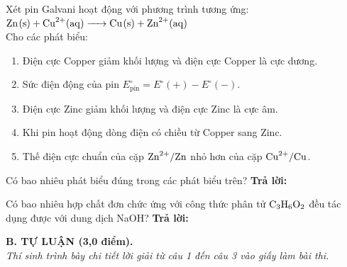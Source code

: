 \documentclass[11pt,a4paper]{article}
\begin{document}
\begin{ex}
Xét pin Galvani hoạt động với phương trình tương ứng: $\ce{Zn(s) + Cu^2+(aq) -> Cu(s) + Zn^2+(aq)}$\\
Cho các phát biểu:
\begin{enumerate}[label=(\alph*),leftmargin=20pt,itemsep=1pt]
\item Điện cực Copper giảm khối lượng và điện cực Copper là cực dương.
\item Sức điện động của pin $E^\circ_\text{pin} = E^\circ(+) - E^\circ(-)$.
\item Điện cực Zinc giảm khối lượng và điện cực Zinc là cực âm.
\item Khi pin hoạt động dòng điện có chiều từ Copper sang Zinc.
\item Thế điện cực chuẩn của cặp $\ce{Zn^2+}/\ce{Zn}$ nhỏ hơn của cặp $\ce{Cu^2+}/\ce{Cu}$.
\end{enumerate}
Có bao nhiêu phát biểu đúng trong các phát biểu trên?
\hfill \textbf{Trả lời:} \dotfill

\end{ex}
\begin{ex}
Có bao nhiêu hợp chất đơn chức ứng với công thức phân tử $\ce{C3H6O2}$ đều tác dụng được với dung dịch NaOH?
\hfill \textbf{Trả lời:} \dotfill

\end{ex}
\vspace{4pt}
\noindent
{\color{mainGreen}\textbf{\Large B. TỰ LUẬN (3,0 điểm).}}\\
\textit{\small Thí sinh trình bày chi tiết lời giải từ câu 1 đến câu 3 vào giấy làm bài thi.}
\vspace{3pt}
\end{document}
